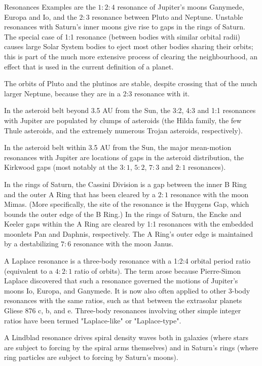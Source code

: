 \begin{frame}[allowframebreaks]{Resonances}
Examples are the $1:2:4$ resonance of Jupiter's moons Ganymede, Europa and Io, and the $2:3$ resonance between Pluto and Neptune. Unstable resonances with Saturn's inner moons give rise to gaps in the rings of Saturn. The special case of 1:1 resonance (between bodies with similar orbital radii) causes large Solar System bodies to eject most other bodies sharing their orbits; this is part of the much more extensive process of clearing the neighbourhood, an effect that is used in the current definition of a planet.

The orbits of Pluto and the plutinos are stable, despite crossing that of the much larger Neptune, because they are in a 2:3 resonance with it.

In the asteroid belt beyond 3.5 AU from the Sun, the 3:2, 4:3 and 1:1 resonances with Jupiter are populated by clumps of asteroids (the Hilda family, the few Thule asteroids, and the extremely numerous Trojan asteroids, respectively).

In the asteroid belt within 3.5 AU from the Sun, the major mean-motion resonances with Jupiter are locations of gaps in the asteroid distribution, the Kirkwood gaps (most notably at the $3:1$, $5:2$, $7:3$ and $2:1$ resonances).

In the rings of Saturn, the Cassini Division is a gap between the inner B Ring and the outer A Ring that has been cleared by a $2:1$ resonance with the moon Mimas. (More specifically, the site of the resonance is the Huygens Gap, which bounds the outer edge of the B Ring.)
    In the rings of Saturn, the Encke and Keeler gaps within the A Ring are cleared by 1:1 resonances with the embedded moonlets Pan and Daphnis, respectively. The A Ring's outer edge is maintained by a destabilizing $7:6$ resonance with the moon Janus.

A Laplace resonance is a three-body resonance with a 1:2:4 orbital period ratio (equivalent to a $4:2:1$ ratio of orbits). The term arose because Pierre-Simon Laplace discovered that such a resonance governed the motions of Jupiter's moons Io, Europa, and Ganymede. It is now also often applied to other 3-body resonances with the same ratios, such as that between the extrasolar planets Gliese 876 c, b, and e. Three-body resonances involving other simple integer ratios have been termed "Laplace-like" or "Laplace-type".

A Lindblad resonance drives spiral density waves both in galaxies (where stars are subject to forcing by the spiral arms themselves) and in Saturn's rings (where ring particles are subject to forcing by Saturn's moons).


\end{frame}
